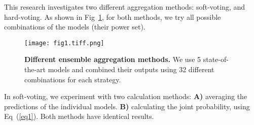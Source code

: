 \documentclass[10pt,letterpaper]{article}
\begin{document}
\begin{table}[!ht]
\begin{adjustwidth}{-1.0in}{0in} %
  \centering
  \caption{
    {\bf The r@k metrics for the networks used to construct the  ensemble model.}}
  \label{table4}
  \end{adjustwidth}
\end{table}

This research investigates two different aggregation methods: soft-voting, and hard-voting. As shown in Fig~\ref{fig1}, for both methods, we try all possible  combinations of the models (their power set).

\begin{figure}[!ht]
\caption{{\bf Different ensemble aggregation methods.} We use 5 state-of-the-art models and combined their outputs using 32 different combinations for each strategy. }
\texttt{[image: fig1.tiff.png]}
\label{fig1}
\end{figure}

In soft-voting, we experiment with two calculation methods: {\bf A)} averaging the predictions of the individual models. {\bf B)} calculating the joint probability, using Eq~(\ref{eq1}). Both methods have identical results.
\end{document}
